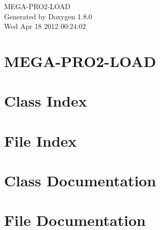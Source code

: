 \documentclass{book}
\begin{document}
\hypersetup{pageanchor=false,citecolor=blue}
\begin{titlepage}
\vspace*{7cm}
\begin{center}
{\Large M\-E\-G\-A-\/\-P\-R\-O2-\/\-L\-O\-A\-D }\\
\vspace*{1cm}
{\large Generated by Doxygen 1.8.0}\\
\vspace*{0.5cm}
{\small Wed Apr 18 2012 00:24:02}\\
\end{center}
\end{titlepage}
\clearemptydoublepage
{}
\tableofcontents
\clearemptydoublepage
{}
\hypersetup{pageanchor=true,citecolor=blue}
\chapter{M\-E\-G\-A-\/\-P\-R\-O2-\/\-L\-O\-A\-D}
\label{index}\hypertarget{index}{}
\chapter{Class Index}

\chapter{File Index}

\chapter{Class Documentation}









\chapter{File Documentation}










\printindex
\end{document}
